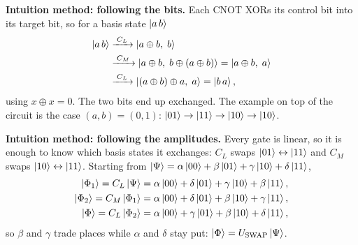 \documentclass[a4paper, 10pt]{article}
\begin{document}
\begin{solution}
	\noindent \textbf{Intuition method: following the bits.} Each CNOT XORs its control bit into its target bit, so for a basis state \( \ket{a\,b} \)
	\begin{align*}
		\ket{a\,b}
		 & \xrightarrow{\;C_L\;} \ket{a \oplus b,\; b}                                             \\
		 & \xrightarrow{\;C_M\;} \ket{a \oplus b,\; b \oplus (a \oplus b)} = \ket{a \oplus b,\; a} \\
		 & \xrightarrow{\;C_L\;} \ket{(a \oplus b) \oplus a,\; a} = \ket{b\,a},
	\end{align*}
	using \( x \oplus x = 0 \). The two bits end up exchanged. The example on top of the circuit is the case \( (a, b) = (0, 1) \): \( \ket{01} \to \ket{11} \to \ket{10} \to \ket{10} \).

	\noindent \textbf{Intuition method: following the amplitudes.} Every gate is linear, so it is enough to know which basis states it exchanges: \( C_L \) swaps \( \ket{01} \leftrightarrow \ket{11} \) and \( C_M \) swaps \( \ket{10} \leftrightarrow \ket{11} \).
	Starting from \( \ket{\Psi} = \alpha\ket{00} + \beta\ket{01} + \gamma\ket{10} + \delta\ket{11} \),
	\begin{align*}
		\ket{\Phi_1} = C_L\ket{\Psi}   & = \alpha\ket{00} + \delta\ket{01} + \gamma\ket{10} + \beta\ket{11}, \\
		\ket{\Phi_2} = C_M\ket{\Phi_1} & = \alpha\ket{00} + \delta\ket{01} + \beta\ket{10} + \gamma\ket{11}, \\
		\ket{\Phi} = C_L\ket{\Phi_2}   & = \alpha\ket{00} + \gamma\ket{01} + \beta\ket{10} + \delta\ket{11},
	\end{align*}
	so \( \beta \) and \( \gamma \) trade places while \( \alpha \) and \( \delta \) stay put: \( \ket{\Phi} = U_{\text{SWAP}}\ket{\Psi} \).


\end{solution}
\end{document}
